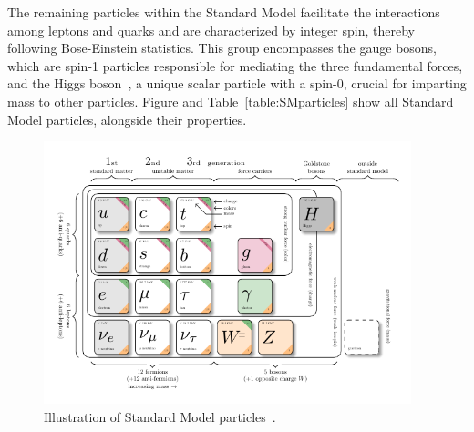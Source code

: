 The remaining particles within the Standard Model facilitate the interactions among leptons and quarks and are characterized by integer spin, thereby following Bose-Einstein statistics. This group encompasses the gauge bosons, which are spin-1 particles responsible for mediating the three fundamental forces, and the Higgs boson~\cite{Higgs:1964ia}, a unique scalar particle with a spin-0, crucial for imparting mass to other particles. 
Figure \label{fig:stdm_higgs} and Table~\ref{table:SMparticles} show all Standard Model particles, alongside their properties.


\begin{figure}[ht]
    \centering
    \includegraphics[width=0.95\textwidth]{figures/theory/model-physics.pdf}
    \caption{Illustration of Standard Model particles~\cite{Burgard2019}.}
    \label{fig:stdm_higgs}
\end{figure}

